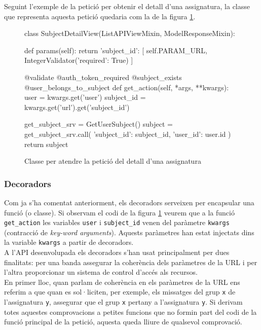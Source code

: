 Seguint l'exemple de la petició per obtenir el detall d'una assignatura,  la classe que representa aquesta petició quedaria com la de la figura \ref{fig:subject_detail_class}.

\begin{figure}[h!]
	\begin{python}
class SubjectDetailView(ListAPIViewMixin, ModelResponseMixin):

	def params(self):
		return {
			'subject_id': [
				self.PARAM_URL, 
				IntegerValidator({'required': True})
			]
		}
		
	@validate
	@auth_token_required
	@subject_exists
	@user_belongs_to_subject
	def get_action(self, *args, **kwargs):
		user = kwargs.get('user')
		subject_id = kwargs.get('url').get('subject_id')
		
		get_subject_srv = GetUserSubject()
		subject = get_subject_srv.call({
			'subject_id': subject_id, 
			'user_id': user.id
		})
		return subject
	\end{python}
	\caption{Classe per atendre la petició del detall d'una assignatura}
	\label{fig:subject_detail_class}
\end{figure}

\subsubsection{Decoradors}

Com ja s'ha comentat anteriorment, els decoradors serveixen per encapsular una funció (o classe). Si observam el codi de la figura \ref{fig:subject_detail_class} veurem que a la funció \texttt{get\_action} les variables \texttt{user} i \texttt{subject\_id} venen del paràmetre \texttt{kwargs} (contracció de \emph{key-word arguments}). Aquests paràmetres han estat injectats dins la variable \texttt{kwargs} a partir de decoradors.\\

A l'\ac{API} desenvolupada els decoradors s'han usat principalment per dues finalitats: per una banda assegurar la coherència dels paràmetres de la \ac{URL} i per l'altra proporcionar un sistema de control d'accés als recursos. \\

En primer lloc, quan parlam de coherència en els paràmetres de la \ac{URL} ens referim a que quan es sol·liciten, per exemple,  els missatges del grup \texttt{x} de l'assignatura \texttt{y}, assegurar que el grup \texttt{x} pertany a l'assignatura \texttt{y}. Si derivam totes aquestes comprovacions a petites funcions que no formin part del codi de la funció principal de la petició, aquesta queda lliure de qualsevol comprovació.\\

